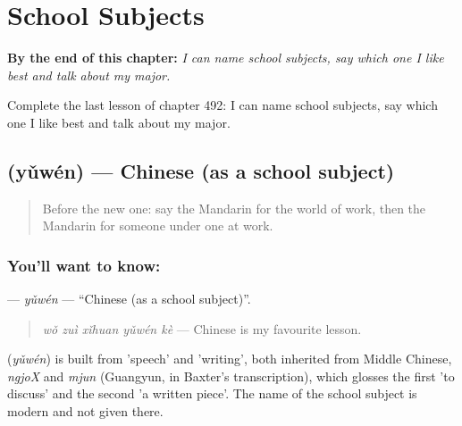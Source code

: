 
\chapter{School Subjects}
\label{ch:zh-school-subjects}

\begin{chapteropening}
\textbf{By the end of this chapter:} \emph{I can name school subjects, say which one I like best and talk about my major.}

Complete the last lesson of chapter 492: I can name school subjects, say which one I like best and talk about my major.
\end{chapteropening}

\section[\texorpdfstring{\zh{语文} (yǔwén)}{语文 (yǔwén)}]{ (yǔwén) — Chinese (as a school subject)}

\label{lesson:ZH-C492-yuwen}



\begin{quote}
Before the new one: say the Mandarin for the world of work, then the Mandarin for someone under one at work.
\end{quote}

\subsection*{You'll want to know: }
\textbf{} — \emph{yǔwén} — \textquotedblleft{}Chinese (as a school subject)\textquotedblright{}.

\begin{quote}
\textbf{} \emph{wǒ zuì xǐhuan yǔwén kè} — Chinese is my favourite lesson.
\end{quote}

\begin{cousinweb}
\textbf{} (\emph{yǔwén}) is built from  'speech' and  'writing', both inherited from Middle Chinese, \emph{ngjoX} and \emph{mjun} (Guangyun, in Baxter's transcription), which glosses the first 'to discuss' and the second 'a written piece'. The name of the school subject is modern and not given there.
\end{cousinweb}

